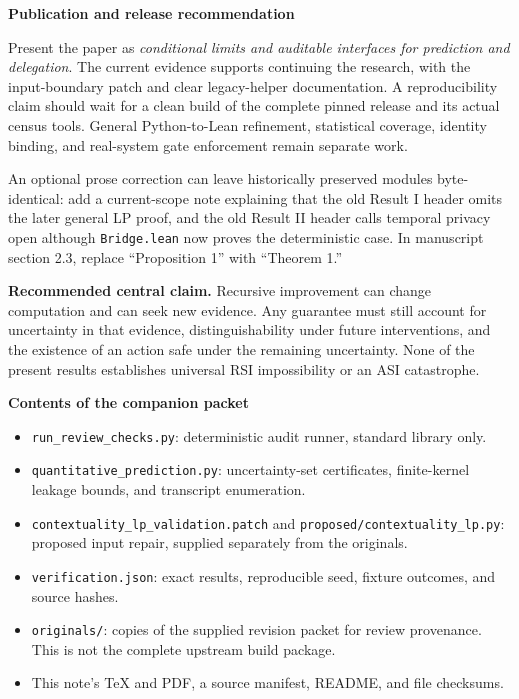 \documentclass[11pt,letterpaper]{article}
\newcommand{\sect}[1]{\vspace{3pt}{\Large\sffamily\bfseries\color{ink}#1}\par\vspace{3pt}}
\newcommand{\sub}[1]{{\bfseries\color{ink}#1}\par}
\newcommand{\note}[1]{\par\vspace{3pt}\noindent\colorbox{pale}{\parbox{\dimexpr\linewidth-2\fboxsep}{#1}}\par\vspace{3pt}}
\newcommand{\code}[1]{\texttt{\small #1}}
\begin{document}
\sub{Publication and release recommendation}
Present the paper as \textit{conditional limits and auditable interfaces for prediction and delegation}. The current evidence supports continuing the research, with the input-boundary patch and clear legacy-helper documentation. A reproducibility claim should wait for a clean build of the complete pinned release and its actual census tools. General Python-to-Lean refinement, statistical coverage, identity binding, and real-system gate enforcement remain separate work.

An optional prose correction can leave historically preserved modules byte-identical: add a current-scope note explaining that the old Result I header omits the later general LP proof, and the old Result II header calls temporal privacy open although \code{Bridge.lean} now proves the deterministic case. In manuscript section 2.3, replace ``Proposition 1'' with ``Theorem 1.''

\note{\textbf{Recommended central claim.} Recursive improvement can change computation and can seek new evidence. Any guarantee must still account for uncertainty in that evidence, distinguishability under future interventions, and the existence of an action safe under the remaining uncertainty. None of the present results establishes universal RSI impossibility or an ASI catastrophe.}

\newpage
\sect{Reproduction, provenance, and references}
\sub{Contents of the companion packet}
\begin{itemize}
\item \code{run\_review\_checks.py}: deterministic audit runner, standard library only.
\item \code{quantitative\_prediction.py}: uncertainty-set certificates, finite-kernel leakage bounds, and transcript enumeration.
\item \code{contextuality\_lp\_validation.patch} and \code{proposed/contextuality\_lp.py}: proposed input repair, supplied separately from the originals.
\item \code{verification.json}: exact results, reproducible seed, fixture outcomes, and source hashes.
\item \code{originals/}: copies of the supplied revision packet for review provenance. This is not the complete upstream build package.
\item This note's TeX and PDF, a source manifest, README, and file checksums.
\end{itemize}
\end{document}
